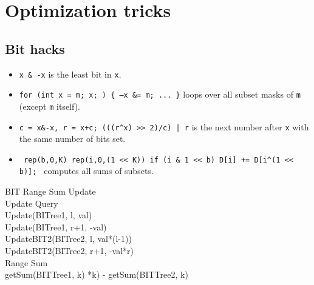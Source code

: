 

\section{Optimization tricks}
\subsection{Bit hacks}
\begin{itemize}
	\item \texttt{x \& -x} is the least bit in \texttt{x}.
	\item \texttt{for (int x = m; x; ) \{ --x \&= m; ... \}} loops over all subset masks of \texttt{m} (except \texttt{m} itself).
	\item \texttt{c = x\&-x, r = x+c; (((r\^{}x) >> 2)/c) | r} is the next number after \texttt{x} with the same number of bits set.
	\item \texttt{ rep(b,0,K) rep(i,0,(1 << K)) if (i \& 1 << b) D[i] += D[i\^{}(1 << b)]; } computes all sums of subsets.
\end{itemize}

BIT Range Sum Update \\ 
Update Query \\
Update(BITree1, l, val) \\ 
Update(BITree1, r+1, -val) \\ 
UpdateBIT2(BITree2, l, val*(l-1)) \\ 
UpdateBIT2(BITree2, r+1, -val*r) \\

Range Sum \\
getSum(BITTree1, k) *k) - getSum(BITTree2, k) \\ 

